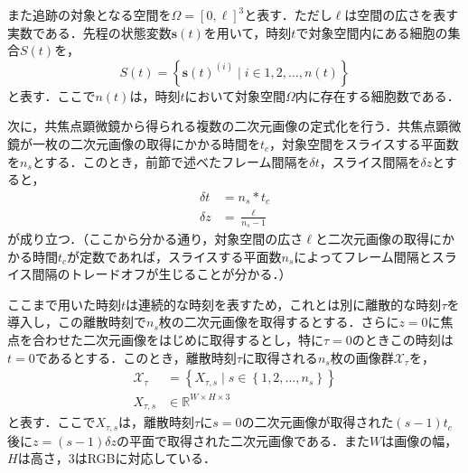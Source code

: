 また追跡の対象となる空間を$\Omega = \left[0, \ell\right]^3$と表す．ただし$\ell$は空間の広さを表す実数である．先程の状態変数$\bm{s}(t)$を用いて，時刻$t$で対象空間内にある細胞の集合$S(t)$を，
\begin{equation}
    \label{eq:set_of_cells_at_time}
    S(t) = \left\{\bm{s}(t)^{(i)} \mid i \in 1,2,\dots,n(t)\right\}
\end{equation}
と表す．ここで$n(t)$は，時刻$t$において対象空間$\Omega$内に存在する細胞数である．

次に，共焦点顕微鏡から得られる複数の二次元画像の定式化を行う．共焦点顕微鏡が一枚の二次元画像の取得にかかる時間を$t_c$，対象空間をスライスする平面数を$n_s$とする．このとき，前節で述べたフレーム間隔を$\delta t$，スライス間隔を$\delta z$とすると，
\begin{equation}
    \label{eq:delta_time_and_z}
    \begin{aligned}
        \delta t &= n_s * t_c
        \\ \delta z &= \frac{\ell}{n_s - 1}
    \end{aligned}
\end{equation}
が成り立つ．（ここから分かる通り，対象空間の広さ$\ell$と二次元画像の取得にかかる時間$t_c$が定数であれば，スライスする平面数$n_s$によってフレーム間隔とスライス間隔のトレードオフが生じることが分かる．）

ここまで用いた時刻$t$は連続的な時刻を表すため，これとは別に離散的な時刻$\tau$を導入し，この離散時刻で$n_s$枚の二次元画像を取得するとする．さらに$z = 0$に焦点を合わせた二次元画像をはじめに取得するとし，特に$\tau = 0$のときこの時刻は$t = 0$であるとする．このとき，離散時刻$\tau$に取得される$n_s$枚の画像群$\mathcal{X}_{\tau}$を，
\begin{equation}
    \label{eq:sliced_images}
    \begin{aligned}
        \mathcal{X}_{\tau} &= \left\{X_{\tau, s} \mid s \in \left\{1, 2, \dots, n_s\right\}\right\}
        \\ X_{\tau, s} &\in \mathbb{R}^{W \times H \times 3}
    \end{aligned}
\end{equation}
と表す．ここで$X_{\tau, s}$は，離散時刻$\tau$に$s = 0$の二次元画像が取得された$(s - 1) t_c$後に$z = (s - 1) \delta z$の平面で取得された二次元画像である．また$W$は画像の幅，$H$は高さ，$3$はRGBに対応している．

